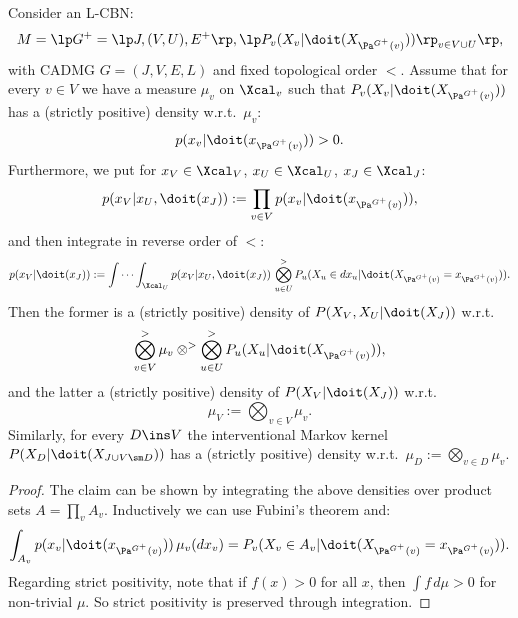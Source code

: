 \begin{Lem}
    \label{lem:cbn-str-pos-density}
    Consider an L-CBN:
        \[M= \lp G^+=\lp J,(V,U),E^+ \rp, \lp P_v ( X_v|\doit( X_{\Pa^{G^+}(v)})) \rp_{v \in V \cup U} \rp,\]
        with \observational CADMG $G=(J,V,E,L)$ and fixed topological order $<$.
    Assume that for every $v \in V$ we have a measure $\mu_v$ on $\Xcal_v$ such that $P_v ( X_v|\doit( X_{\Pa^{G^+}(v)}))$
    has a (strictly positive) density w.r.t.\ $\mu_v$:
    \[ p(x_v|\doit(x_{\Pa^{G^+}(v)})) > 0. \]
    Furthermore, we put for $x_V \in \Xcal_V$, $x_U \in \Xcal_U$, $x_J \in \Xcal_J$:
    \[ p(x_V|x_U,\doit(x_J)) := \prod_{v \in V} p(x_v|\doit(x_{\Pa^{G^+}(v)})),  \]
    and then integrate in reverse order of $<$:
    \[ p(x_V|\doit(x_J)) := \idotsint_{\Xcal_U} p(x_V|x_U,\doit(x_J)) \, 
    \bigotimes_{ u \in U}^> P_u (X_u \in dx_u|\doit( X_{\Pa^{G^+}(v)} = x_{\Pa^{G^+}(v)} )).   \]
    Then the former is a (strictly positive) density of $P(X_V,X_U|\doit(X_J))$ w.r.t.\ 
    \[ \bigotimes_{ v \in V}^> \mu_v \otimes^> \bigotimes_{ u \in U}^> P_u (X_u|\doit( X_{\Pa^{G^+}(v)} )), \]
    and the latter a (strictly positive) density of $P(X_V|\doit(X_J))$ w.r.t.\ 
    \[ \mu_V := \bigotimes_{ v \in V} \mu_v. \]
    Similarly, for every $D \ins V$ the interventional Markov kernel $P(X_D|\doit(X_{J \cup V \sm D}))$ has
    a (strictly positive) density w.r.t.\ $\mu_D:=\bigotimes_{ v \in D} \mu_v$.
    \begin{proof}
    The claim can be shown by integrating the above densities over product sets $A = \prod_v A_v$.
    Inductively we can use Fubini's theorem and:
    \[ \int_{A_v} p(x_v|\doit(x_{\Pa^{G^+}(v)}))\, \mu_v(dx_v) = P_v(X_v \in A_v|\doit( X_{\Pa^{G^+}(v)}=x_{\Pa^{G^+}(v)})).\]
     Regarding strict positivity, note that if $f(x) > 0$ for all $x$, then $\int f\, d\mu >0$ for non-trivial $\mu$. 
        So strict positivity is preserved through integration.
    \end{proof}
\end{Lem}

